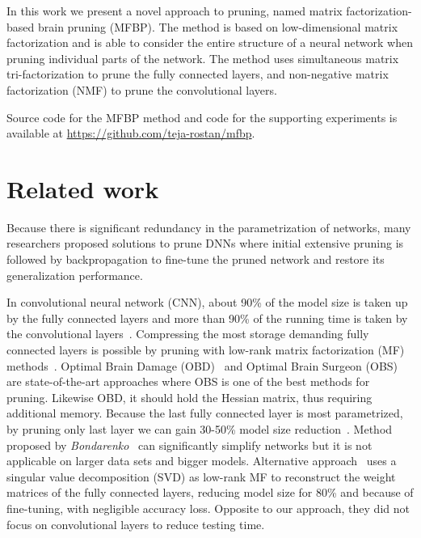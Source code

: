 \documentclass{article} %
\begin{document}
In this work we present a novel approach to pruning, named matrix factorization-based 
brain pruning (MFBP). The method is based on low-dimensional matrix factorization and is 
able to consider the entire structure of a neural network when pruning individual parts of
the network. The method uses simultaneous matrix tri-factorization to prune the fully 
connected layers, and non-negative matrix factorization (NMF) to prune the convolutional 
layers.

Source code for the MFBP method and code for the supporting experiments is available
at \url{https://github.com/teja-rostan/mfbp}.

\section{Related work}

Because there is significant redundancy in the parametrization of networks, many 
researchers proposed solutions to prune DNNs where initial extensive pruning is followed 
by backpropagation to fine-tune the pruned network and restore its generalization 
performance.

In convolutional neural network (CNN), about 90\% of the model size is taken up by the 
fully connected layers and more than 90\%  of the running time is taken by the 
convolutional layers~\cite{zeiler2014visualizing}. Compressing the most storage demanding 
fully connected layers is possible by pruning with low-rank matrix factorization (MF)
methods~\cite{lecun1989optimal, hassibi1993optimal, bondarenko2014artificial, 
sainath2013low}. Optimal Brain Damage (OBD)~\cite{lecun1989optimal} and Optimal 
Brain Surgeon (OBS)~\cite{hassibi1993optimal} are state-of-the-art approaches where OBS 
is one of the best methods for pruning. Likewise OBD, it should hold the Hessian matrix, 
thus requiring additional memory. Because the last fully connected layer is most 
parametrized, by pruning only last layer we can gain 30-50\% model size 
reduction~\cite{sainath2013low}. Method proposed by 
\textit{Bondarenko}~\cite{bondarenko2014artificial} can significantly simplify networks 
but it is not applicable on larger data sets and bigger models. Alternative 
approach~\cite{xue2013restructuring} uses a singular value decomposition (SVD) as low-rank
MF to reconstruct the weight matrices of the fully connected layers, reducing model size 
for 80\% and because of fine-tuning, with negligible accuracy loss. Opposite to our 
approach, they did not focus on convolutional layers to reduce testing time.
\end{document}
